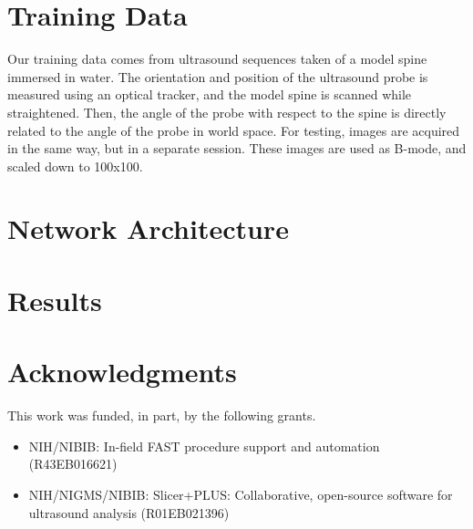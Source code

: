 \documentclass{llncs}
\begin{document}
\section{Training Data}
Our training data comes from ultrasound sequences taken of a model spine immersed in water. The orientation and position of the ultrasound probe is measured using an optical tracker, and the model spine is scanned while straightened. Then, the angle of the probe with respect to the spine is directly related to the angle of the probe in world space. For testing, images are acquired in the same way, but in a separate session. These images are used as B-mode, and scaled down to 100x100.

\section{Network Architecture}

\section{Results}






\section*{Acknowledgments}
This work was funded, in part, by the following grants.
\begin{itemize}
	\item NIH/NIBIB: In-field FAST procedure support and automation (R43EB016621) 
	\item NIH/NIGMS/NIBIB: Slicer+PLUS: Collaborative, open-source software for ultrasound analysis (R01EB021396)
\end{itemize}

%
%



\end{document}
